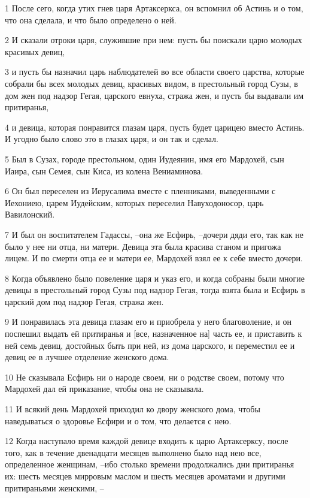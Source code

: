 \par 1 После сего, когда утих гнев царя Артаксеркса, он вспомнил об Астинь и о том, что она сделала, и что было определено о ней.
\par 2 И сказали отроки царя, служившие при нем: пусть бы поискали царю молодых красивых девиц,
\par 3 и пусть бы назначил царь наблюдателей во все области своего царства, которые собрали бы всех молодых девиц, красивых видом, в престольный город Сузы, в дом жен под надзор Гегая, царского евнуха, стража жен, и пусть бы выдавали им притиранья,
\par 4 и девица, которая понравится глазам царя, пусть будет царицею вместо Астинь. И угодно было слово это в глазах царя, и он так и сделал.
\par 5 Был в Сузах, городе престольном, один Иудеянин, имя его Мардохей, сын Иаира, сын Семея, сын Киса, из колена Вениаминова.
\par 6 Он был переселен из Иерусалима вместе с пленниками, выведенными с Иехониею, царем Иудейским, которых переселил Навуходоносор, царь Вавилонский.
\par 7 И был он воспитателем Гадассы, --она же Есфирь, --дочери дяди его, так как не было у нее ни отца, ни матери. Девица эта была красива станом и пригожа лицем. И по смерти отца ее и матери ее, Мардохей взял ее к себе вместо дочери.
\par 8 Когда объявлено было повеление царя и указ его, и когда собраны были многие девицы в престольный город Сузы под надзор Гегая, тогда взята была и Есфирь в царский дом под надзор Гегая, стража жен.
\par 9 И понравилась эта девица глазам его и приобрела у него благоволение, и он поспешил выдать ей притиранья и [все, назначенное на] часть ее, и приставить к ней семь девиц, достойных быть при ней, из дома царского, и переместил ее и девиц ее в лучшее отделение женского дома.
\par 10 Не сказывала Есфирь ни о народе своем, ни о родстве своем, потому что Мардохей дал ей приказание, чтобы она не сказывала.
\par 11 И всякий день Мардохей приходил ко двору женского дома, чтобы наведываться о здоровье Есфири и о том, что делается с нею.
\par 12 Когда наступало время каждой девице входить к царю Артаксерксу, после того, как в течение двенадцати месяцев выполнено было над нею все, определенное женщинам, --ибо столько времени продолжались дни притиранья их: шесть месяцев мирровым маслом и шесть месяцев ароматами и другими притираньями женскими, --

